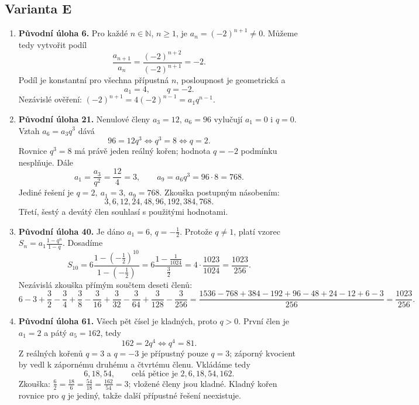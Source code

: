 \documentclass[a4paper,10pt]{article}
\begin{document}
\subsection*{Varianta E}
\begin{enumerate}
\item \textbf{Původní úloha 6.}
Pro každé $n\in\mathbb N$, $n\geq1$, je $a_n=(-2)^{n+1}\ne0$.
Můžeme tedy vytvořit podíl
\[
\frac{a_{n+1}}{a_n}=\frac{(-2)^{n+2}}{(-2)^{n+1}}=-2.
\]
Podíl je konstantní pro všechna přípustná $n$, posloupnost je geometrická a
\[
\boxed{a_1=4,\qquad q=-2.}
\]
Nezávislé ověření: $(-2)^{n+1}=4(-2)^{n-1}=a_1q^{n-1}$.

\item \textbf{Původní úloha 21.}
Nenulové členy $a_3=12$, $a_6=96$ vylučují $a_1=0$ i $q=0$.
Vztah $a_6=a_3q^3$ dává
\[
96=12q^3\iff q^3=8\iff q=2.
\]
Rovnice $q^3=8$ má právě jeden reálný kořen;
hodnota $q=-2$ podmínku nesplňuje. Dále
\[
a_1=\frac{a_3}{q^2}=\frac{12}{4}=3,\qquad
a_9=a_6q^3=96\cdot8=768.
\]
Jediné řešení je $\boxed{q=2,\ a_1=3,\ a_9=768}$.
Zkouška postupným násobením:
\[
3,6,12,24,48,96,192,384,768.
\]
Třetí, šestý a devátý člen souhlasí s použitými hodnotami.

\item \textbf{Původní úloha 40.}
Je dáno $a_1=6$, $q=-\frac12$. Protože $q\ne1$, platí vzorec
$S_n=a_1\frac{1-q^n}{1-q}$. Dosadíme
\[
S_{10}=6\frac{1-\left(-\frac12\right)^{10}}{1-\left(-\frac12\right)}
=6\frac{1-\frac1{1024}}{\frac32}
=4\cdot\frac{1023}{1024}
=\boxed{\frac{1023}{256}}.
\]
Nezávislá zkouška přímým součtem deseti členů:
\[
6-3+\frac32-\frac34+\frac38-\frac3{16}
+\frac3{32}-\frac3{64}+\frac3{128}-\frac3{256}
=\frac{1536-768+384-192+96-48+24-12+6-3}{256}
=\frac{1023}{256}.
\]

\item \textbf{Původní úloha 61.}
Všech pět čísel je kladných, proto $q>0$. První člen je $a_1=2$
a pátý $a_5=162$, tedy
\[
162=2q^4\iff q^4=81.
\]
Z reálných kořenů $q=3$ a $q=-3$ je přípustný pouze $q=3$;
záporný kvocient by vedl k zápornému druhému a čtvrtému členu.
Vkládáme tedy
\[
\boxed{6,18,54},\qquad\text{celá pětice je }2,6,18,54,162.
\]
Zkouška: $\frac62=\frac{18}6=\frac{54}{18}=\frac{162}{54}=3$;
vložené členy jsou kladné. Kladný kořen rovnice pro $q$ je jediný,
takže další přípustné řešení neexistuje.
\end{enumerate}

\newpage
\end{document}
